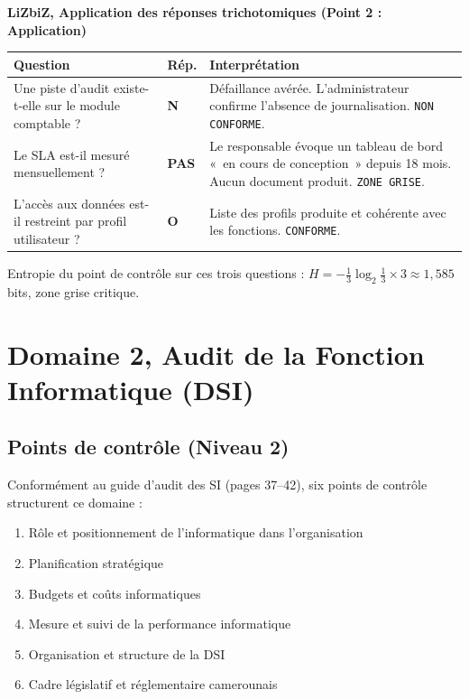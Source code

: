 \begin{boxlizbiz}
\textbf{LiZbiZ, Application des réponses trichotomiques (Point 2 : Application)}

\smallskip
\begin{tabular}{p{4.5cm}p{1cm}p{5cm}}
\textbf{Question} & \textbf{Rép.} & \textbf{Interprétation} \\
\midrule
Une piste d'audit existe-t-elle sur le module comptable ? & \textbf{N} & Défaillance avérée. L'administrateur confirme l'absence de journalisation. \texttt{NON CONFORME}. \\
\addlinespace
Le SLA est-il mesuré mensuellement ? & \textbf{PAS} & Le responsable évoque un tableau de bord «~en cours de conception~» depuis 18 mois. Aucun document produit. \texttt{ZONE GRISE}. \\
\addlinespace
L'accès aux données est-il restreint par profil utilisateur ? & \textbf{O} & Liste des profils produite et cohérente avec les fonctions. \texttt{CONFORME}. \\
\end{tabular}

\smallskip
Entropie du point de contrôle sur ces trois questions : $H = -\frac{1}{3}\log_2\frac{1}{3} \times 3 \approx 1{,}585$ bits, zone grise critique.
\end{boxlizbiz}


\section{Domaine 2, Audit de la Fonction Informatique (DSI)}
\label{sec:decomp-dsi}

\subsection{Points de contrôle (Niveau 2)}

Conformément au guide d'audit des SI (pages 37--42), six points de contrôle structurent ce domaine :

\begin{enumerate}
    \item Rôle et positionnement de l'informatique dans l'organisation
    \item Planification stratégique
    \item Budgets et coûts informatiques
    \item Mesure et suivi de la performance informatique
    \item Organisation et structure de la DSI
    \item Cadre législatif et réglementaire camerounais
\end{enumerate}

